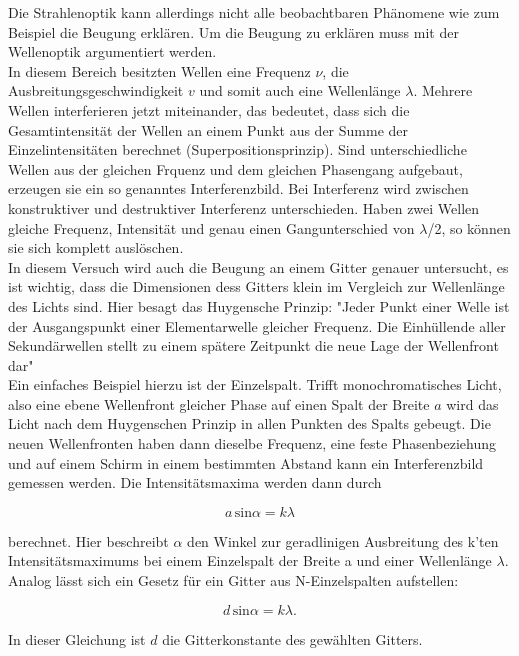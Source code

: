         \noindent Die Strahlenoptik kann allerdings nicht alle beobachtbaren Phänomene wie zum Beispiel die Beugung erklären. Um die Beugung zu erklären muss mit der Wellenoptik argumentiert werden.\\
        In diesem Bereich besitzten Wellen eine Frequenz $\nu$, die Ausbreitungsgeschwindigkeit $v$ und somit auch eine Wellenlänge $\lambda$.
        Mehrere Wellen interferieren jetzt miteinander, das bedeutet, dass sich die Gesamtintensität der Wellen an einem Punkt aus der Summe der 
        Einzelintensitäten berechnet (Superpositionsprinzip). Sind unterschiedliche Wellen aus der gleichen Frquenz und dem gleichen Phasengang 
        aufgebaut, erzeugen sie ein so genanntes Interferenzbild. Bei Interferenz wird zwischen konstruktiver und destruktiver Interferenz 
        unterschieden. Haben zwei Wellen gleiche Frequenz, Intensität und genau einen Gangunterschied von $\lambda$/2, so können sie sich 
        komplett auslöschen.\\
        In diesem Versuch wird auch die Beugung an einem Gitter genauer untersucht, es ist wichtig, dass die Dimensionen dess Gitters klein im 
        Vergleich zur Wellenlänge des Lichts sind. Hier besagt das Huygensche Prinzip: "Jeder Punkt einer Welle ist der Ausgangspunkt einer 
        Elementarwelle gleicher Frequenz. Die Einhüllende aller Sekundärwellen stellt zu einem spätere Zeitpunkt die neue Lage der Wellenfront
        dar" \cite{400}\\
        Ein einfaches Beispiel hierzu ist der Einzelspalt. Trifft monochromatisches Licht, also eine ebene Wellenfront gleicher Phase auf einen Spalt der Breite $a$ wird das Licht nach dem Huygenschen Prinzip in allen Punkten des Spalts gebeugt. Die neuen Wellenfronten 
        haben dann dieselbe Frequenz, eine feste Phasenbeziehung und auf einem Schirm in einem bestimmten Abstand kann ein Interferenzbild gemessen werden. 
        Die Intensitätsmaxima werden dann durch 

        \begin{equation}
            a \, \text{sin} \alpha = k \lambda
        \end{equation}

        \noindent
        berechnet. Hier beschreibt $\alpha$ den Winkel zur geradlinigen Ausbreitung des k'ten Intensitätsmaximums bei einem Einzelspalt der Breite a 
        und einer Wellenlänge $\lambda$.\\
        Analog lässt sich ein Gesetz für ein Gitter aus N-Einzelspalten aufstellen:

        \begin{equation}
            d \, \text{sin} \alpha = k \lambda.
        \end{equation}

        \noindent In dieser Gleichung ist $d$ die Gitterkonstante des gewählten Gitters.
